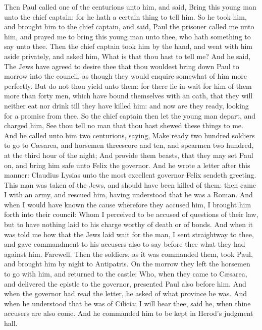  Then Paul called one of the centurions unto him, and
said, Bring this young man unto the chief captain: for he hath a certain
thing to tell him.  So he took him, and brought him to
the chief captain, and said, Paul the prisoner called me unto him, and
prayed me to bring this young man unto thee, who hath something to say
unto thee.  Then the chief captain took him by the hand,
and went with him aside privately, and asked him, What is that thou hast
to tell me?  And he said, The Jews have agreed to desire
thee that thou wouldest bring down Paul to morrow into the council, as
though they would enquire somewhat of him more perfectly.
 But do not thou yield unto them: for there lie in wait
for him of them more than forty men, which have bound themselves with an
oath, that they will neither eat nor drink till they have killed him:
and now are they ready, looking for a promise from thee. 
So the chief captain then let the young man depart, and charged him, See
thou tell no man that thou hast shewed these things to me.
 And he called unto him two centurions, saying, Make
ready two hundred soldiers to go to Cæsarea, and horsemen threescore and
ten, and spearmen two hundred, at the third hour of the night;
 And provide them beasts, that they may set Paul on, and
bring him safe unto Felix the governor.  And he wrote a
letter after this manner:  Claudius Lysias unto the most
excellent governor Felix sendeth greeting.  This man was
taken of the Jews, and should have been killed of them: then came I with
an army, and rescued him, having understood that he was a Roman.
 And when I would have known the cause wherefore they
accused him, I brought him forth into their council: 
Whom I perceived to be accused of questions of their law, but to have
nothing laid to his charge worthy of death or of bonds. 
And when it was told me how that the Jews laid wait for the man, I sent
straightway to thee, and gave commandment to his accusers also to say
before thee what they had against him. Farewell.  Then
the soldiers, as it was commanded them, took Paul, and brought him by
night to Antipatris.  On the morrow they left the
horsemen to go with him, and returned to the castle: 
Who, when they came to Cæsarea, and delivered the epistle to the
governor, presented Paul also before him.  And when the
governor had read the letter, he asked of what province he was. And when
he understood that he was of Cilicia;  I will hear thee,
said he, when thine accusers are also come. And he commanded him to be
kept in Herod's judgment hall.


